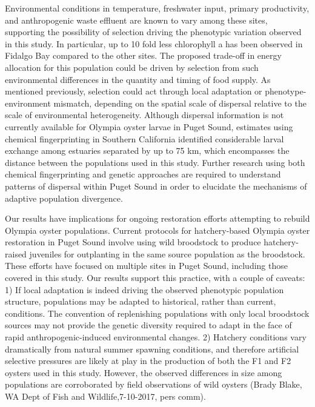 \documentclass[fleqn,10pt]{wlscirep}
\begin{document}
Environmental conditions in temperature, freshwater input, primary productivity, and anthropogenic waste effluent are known to vary among these sites\cite{Heare2017-uv}, supporting the possibility of selection driving the phenotypic variation observed in this study. In particular, up to 10 fold less chlorophyll a has been observed in Fidalgo Bay compared to the other sites. The proposed trade-off in energy allocation for this population could be driven by selection from such environmental differences in the quantity and timing of food supply\cite{Heino1999-fb,Pontarp2015-oc}. As mentioned previously, selection could act through local adaptation or phenotype-environment mismatch, depending on the spatial scale of dispersal relative to the scale of environmental heterogeneity. Although dispersal information is not currently available for Olympia oyster larvae in Puget Sound, estimates using chemical fingerprinting in Southern California identified considerable larval exchange among estuaries separated by up to 75 km\cite{Carson2010-xi}, which encompasses the distance between the populations used in this study. Further research using both chemical fingerprinting and genetic approaches are required to understand patterns of dispersal within Puget Sound in order to elucidate the mechanisms of adaptive population divergence.\par
Our results have implications for ongoing restoration efforts attempting to rebuild Olympia oyster populations. Current protocols for hatchery-based Olympia oyster restoration in Puget Sound involve using wild broodstock to produce hatchery-raised juveniles for outplanting in the same source population as the broodstock\cite{Blake2012-ln}. These efforts have focused on multiple sites in Puget Sound, including those covered in this study. Our results support this practice, with a couple of caveats: 1) If local adaptation is indeed driving the observed phenotypic population structure, populations may be adapted to historical, rather than current, conditions. The convention of replenishing populations with only local broodstock sources may not provide the genetic diversity required to adapt in the face of rapid anthropogenic-induced environmental changes\cite{Jones2013-pe}. 2) Hatchery conditions vary dramatically from natural summer spawning conditions, and therefore artificial selective pressures are likely at play in the production of both the F1 and F2 oysters used in this study\cite{McClure2008-al}. However, the observed differences in size among populations are corroborated by field observations of wild oysters (Brady Blake, WA Dept of Fish and Wildlife,7-10-2017, pers comm).\par
\end{document}
